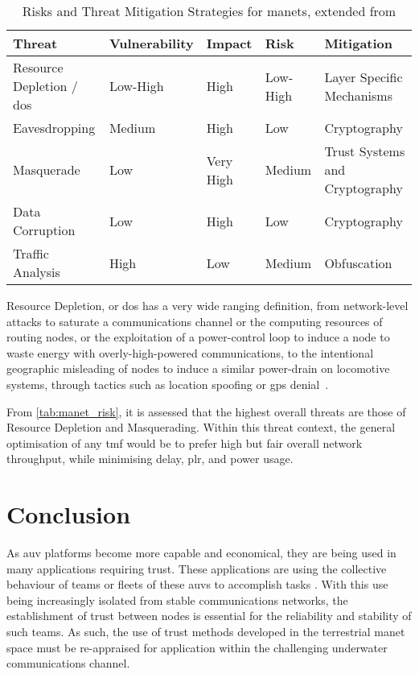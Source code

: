 \begin{table}
	\caption{Risks and Threat Mitigation Strategies for \glspl{manet}, extended from \cite{Kidston2010}}
	\label{tab:manet_risk}
	\begin{tabularx}{\textwidth}{X X X X X}\toprule
		Threat & Vulnerability & Impact & Risk & Mitigation	\\\midrule
		Resource Depletion / \gls{dos} & Low-High & High & Low-High & Layer Specific Mechanisms\cite{Wu2007,Nwaocha2015}\\
		Eavesdropping & Medium & High & Low & Cryptography \cite{Chen2010}\\
		Masquerade & Low & Very High & Medium & Trust Systems\cite{Wang2009a} and Cryptography\\
		Data Corruption & Low & High & Low & Cryptography\\
		Traffic Analysis & High & Low & Medium & Obfuscation\cite{Huang2010}\\
	\end{tabularx}
\end{table}

Resource Depletion, or \gls{dos} has a very wide ranging definition, from network-level attacks to saturate a communications channel or the computing resources of routing nodes, or the exploitation of a power-control loop to induce a node to waste energy with overly-high-powered communications, to the intentional geographic misleading of nodes to induce a similar power-drain on locomotive systems, through tactics such as location spoofing or \gls{gps} denial~\cite{Zuba2015}.

From \autoref{tab:manet_risk}, it is assessed that the highest overall threats are those of Resource Depletion and Masquerading.
Within this threat context, the general optimisation of any \gls{tmf} would be to prefer high but fair overall network throughput, while minimising delay, \gls{plr}, and power usage.

\section{Conclusion}

As \acrfull{auv} platforms become more capable and economical, they are being used in many applications requiring trust.
These applications are using the collective behaviour of teams or fleets of these \glspl{auv} to accomplish tasks \cite{Caiti2011}.
With this use being increasingly isolated from stable communications networks, the establishment of trust between nodes is essential for the reliability and stability of such teams.
As such, the use of trust methods developed in the terrestrial \gls{manet} space must be re-appraised for application within the challenging underwater communications channel.

